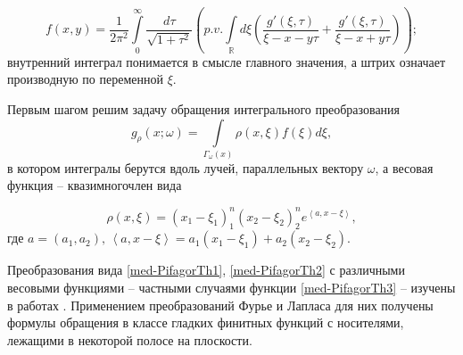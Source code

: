 $$f(x,y)=\frac{1}{2\pi^2}\int\limits_0^\infty\frac{d\tau}{\sqrt{1+\tau^2}}\left(p.v.\int\limits_\mathbb R d\xi\left( \frac{g'(\xi,\tau)}{\xi-x-y\tau}+\frac{g'(\xi,\tau)}{\xi-x+y\tau}\right)\right);$$
внутренний интеграл понимается в смысле главного значения, а штрих означает производную по переменной $\xi$.

Первым шагом решим задачу обращения интегрального преобразования
\begin{equation}
\label{med-PifagorTh2}
g_\rho(x;\omega)=\int\limits_{\Gamma_\omega(x)}\rho(x,\xi)f(\xi)d\xi,\end{equation}
в котором интегралы берутся вдоль лучей, параллельных вектору $\omega$, а весовая функция -- квазимногочлен вида

\begin{equation}
\label{med-PifagorTh3}
\rho(x,\xi)=(x_1-\xi_1)^n_1(x_2-\xi_2)^n_2e^{\left<a,x-\xi\right>},\end{equation}
где $a=(a_1,a_2), \, \left<a,x-\xi\right>=a_1(x_1-\xi_1)+a_2(x_2-\xi_2)$.

Преобразования вида \eqref{med-PifagorTh1}, \eqref{med-PifagorTh2} с различными весовыми функциями -- частными случаями функции \eqref{med-PifagorTh3} -- изучены в работах \cite{med-metka5, med-metka6}. Применением преобразований Фурье и Лапласа для них получены формулы обращения в классе гладких финитных функций с носителями, лежащими в некоторой полосе на плоскости.














